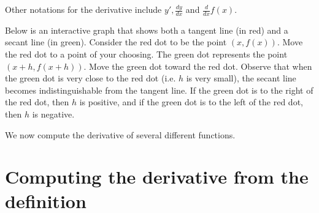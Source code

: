 \documentclass[handout]{ximera}
\begin{document}
\begin{remark}
Other notations for the derivative include $y',\frac{dy}{dx}$ and $\frac{d}{dx} f(x)$.\\
\end{remark}

Below is an interactive graph that shows both a tangent line (in red) and a secant line (in green).
Consider the red dot to be the point $(x, f(x))$. Move the red dot to a point of your choosing.
The green dot represents the point $(x+h, f(x+h))$. Move the green dot toward the red dot.
Observe that when the green dot is very close to the red dot (i.e. $h$ is very small), 
the secant line becomes indistinguishable from the tangent line. 
If the green dot is to the right of the red dot, then $h$ is positive, and if the green dot is to the left of 
the red dot, then $h$ is negative.









We now compute the derivative of several different functions.\\

\section{Computing the derivative from the definition}
\end{document}
